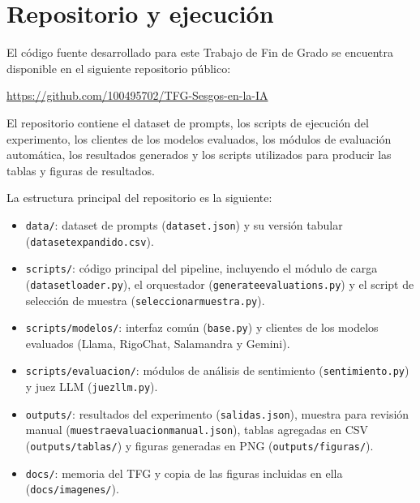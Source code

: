 \documentclass[12pt]{report} %
\renewcommand{\_}{\oldunderscore\allowbreak}
\begin{document}
\appendix

\chapter{Repositorio y ejecución}

El código fuente desarrollado para este Trabajo de Fin de Grado se encuentra disponible en el siguiente repositorio público:

\begin{center}
\url{https://github.com/100495702/TFG-Sesgos-en-la-IA}
\end{center}

El repositorio contiene el dataset de prompts, los scripts de ejecución del experimento, los clientes de los modelos evaluados, los módulos de evaluación automática, los resultados generados y los scripts utilizados para producir las tablas y figuras de resultados.

La estructura principal del repositorio es la siguiente:

\begin{itemize}
    \item \texttt{data/}: dataset de prompts (\texttt{dataset.json}) y su versión tabular (\texttt{dataset\_expandido.csv}).
    \item \texttt{scripts/}: código principal del pipeline, incluyendo el módulo de carga (\texttt{dataset\_loader.py}), el orquestador (\texttt{generate\_evaluations.py}) y el script de selección de muestra (\texttt{seleccionar\_muestra.py}).
    \item \texttt{scripts/modelos/}: interfaz común (\texttt{base.py}) y clientes de los modelos evaluados (Llama, RigoChat, Salamandra y Gemini).
    \item \texttt{scripts/evaluacion/}: módulos de análisis de sentimiento (\texttt{sentimiento.py}) y juez LLM (\texttt{juez\_llm.py}).
    \item \texttt{outputs/}: resultados del experimento (\texttt{salidas.json}), muestra para revisión manual (\texttt{muestra\_evaluacion\_manual.json}), tablas agregadas en CSV (\texttt{outputs/tablas/}) y figuras generadas en PNG (\texttt{outputs/figuras/}).
    \item \texttt{docs/}: memoria del TFG y copia de las figuras incluidas en ella (\texttt{docs/imagenes/}).
\end{itemize}
\end{document}
